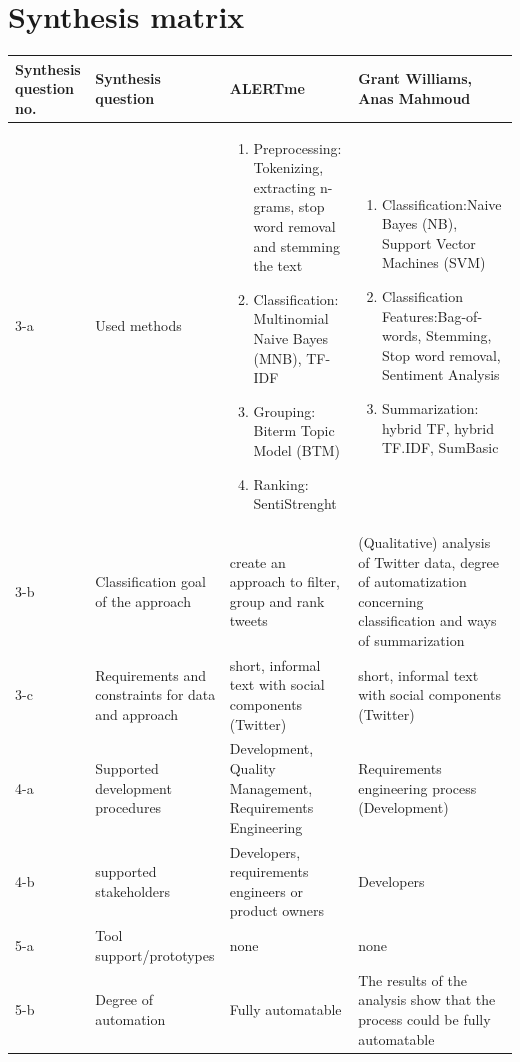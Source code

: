 \documentclass[a4paper,10pt, bibliography=totocnumbered]{scrreprt}
\begin{document}
\pagebreak
\section{Synthesis matrix}
\begin{center}
\begin{tabular}{ | m{4em} | m{}| m{5cm} | m{5cm} | } 
  \hline
  Synthesis question no. & Synthesis question & ALERTme & Grant Williams, Anas Mahmoud \\ 
  \hline
  3-a & Used methods & \begin{enumerate}
    \item Preprocessing: Tokenizing, extracting n-grams, stop word removal and stemming the text
    \item Classification: Multinomial Naive Bayes (MNB), TF-IDF 
    \item Grouping: Biterm Topic Model (BTM)
    \item Ranking: SentiStrenght
\end{enumerate} & \begin{enumerate}
    \item Classification:Naive Bayes (NB), Support Vector Machines (SVM)
    \item Classification Features:Bag-of-words, Stemming, Stop word removal, Sentiment Analysis
    \item Summarization: hybrid TF, hybrid TF.IDF, SumBasic
\end{enumerate} \\ 
  \hline
  3-b & Classification goal of the approach & create an approach to filter, group and rank tweets & (Qualitative) analysis of Twitter data, degree of automatization concerning classification and ways of summarization \\ 
  \hline
  3-c & Requirements and constraints for data and approach	 & short, informal text with social components (Twitter)
 & short, informal text with social components (Twitter)
 \\ 
  \hline
  4-a & Supported development procedures & Development, Quality Management, Requirements Engineering
 & Requirements engineering process (Development) \\ 
  \hline
  4-b & supported stakeholders & Developers, requirements engineers or product owners & Developers \\ 
  \hline
  5-a & Tool support/prototypes & none & none \\ 
  \hline
  5-b & Degree of automation & Fully automatable & The results of the analysis show that the process could be fully automatable \\ 
  \hline
\end{tabular}
\end{center}
\end{document}
